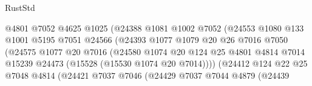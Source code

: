 \begin{lexlean}{RustStd}
\begin{coremodule}
                                      @4801
                                      @7052
                                      @4625
                                      @1025
                                      (@24388
                                        @1081
                                        @1002
                                        @7052
                                        (@24553
                                          @1080
                                          @133
                                          @1001
                                          @5195
                                          @7051
                                          @24566
                                          (@24393
                                            @1077
                                            @1079
                                            @20
                                            @26
                                            @7016
                                            @7050
                                            (@24575
                                              @1077
                                              @20
                                              @7016
                                              (@24580
                                                @1074
                                                @20
                                                @124
                                                @25
                                                @4801
                                                @4814
                                                @7014
                                                @15239
                                                @24473
                                                (@15528 (@15530 @1074 @20 @7014))))
                                            (@24412
                                              @124
                                              @22
                                              @25
                                              @7048
                                              @4814
                                              (@24421
                                                @7037
                                                @7046
                                                (@24429
                                                  @7037
                                                  @7044
                                                  @4879
                                                  (@24439

\end{coremodule}
\end{lexlean}

